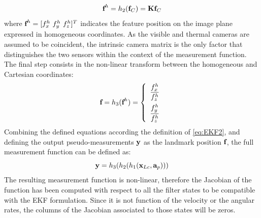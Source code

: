 \begin{equation}
    \label{eq:h2}
    \mathrm{\textbf{f}}^h = h_2(\mathrm{\textbf{f}}_C) = \mathrm{\textbf{K}}\mathrm{\textbf{f}}_C
\end{equation}
where $\vect{f}^h = [f_x^h \ f_y^h \ f_z^h]^T$ indicates the feature position on the image plane expressed in homogeneous coordinates. As the visible and thermal cameras are assumed to be coincident, the intrinsic camera matrix is the only factor that distinguishes the two sensors within the context of the measurement function.\\
The final step consists in the non-linear transform between the homogeneous and Cartesian coordinates:
\begin{equation}
    \label{eq:h3}
    \mathrm{\textbf{f}} = h_3(\mathrm{\textbf{f}}^h) = \left\{ \begin{array}{c}
         \dfrac{f_x^h}{f_z^h}  \\[10pt]
         \dfrac{f_y^h}{f_z^h}  
    \end{array}\right.
\end{equation}
Combining the defined equations according the definition of \cref{eq:EKF2}, and defining the output pseudo-measurements $\mathrm{\textbf{y}}$ as the landmark position $\mathrm{\textbf{f}}$, the full measurement function can be defined as:
\begin{equation}
    \mathrm{\textbf{y}} = h_3(h_2(h_1(\mathrm{\textbf{x}}_{Lc},\mathrm{\textbf{a}}_p)))
\end{equation}
The resulting measurement function is non-linear, therefore the Jacobian of the function has been computed with respect to all the filter states to be compatible with the EKF formulation. Since it is not function of the velocity or the angular rates, the columns of the Jacobian associated to those states will be zeros. 

